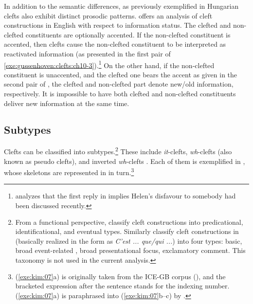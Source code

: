 In addition to the semantic differences, as previously exemplified in
Hungarian  clefts also exhibit distinct prosodic
patterns.  \citet{gussenhoven:07} offers an analysis of cleft
constructions in English with respect to information status.  The
clefted and non-clefted constituents are optionally accented.  If the
non-clefted constituent is accented, then clefts cause the non-clefted
constituent to be interpreted as reactivated information (as presented
in the first pair of
\ref{exe:gussenhoven:clefts:ch10-3}).\footnote{\citet{gussenhoven:07}
  analyzes that the first reply in
   implies Helen's disfavour
  to somebody had been discussed recently.}  On the other hand, if the
non-clefted constituent is unaccented, and the clefted one bears the
accent as given in the second pair of
, the clefted and
non-clefted part denote new/old information, respectively. It is
impossible to have both clefted and non-clefted constituents deliver
new information at the same time.



\subsection{Subtypes}
\label{10:sssec:clefts:subtypes}


Clefts can be classified into subtypes.\footnote{From a
  functional perspective, \citet{kim:yang:09} classify cleft
  constructions into predicational, identificational, and eventual
  types.  Similarly \citet{clech:99} classify cleft constructions in
   (basically realized in the form as \textit{C'est ... que/qui
    ...})  into four types: basic, broad event-related , broad
  presentational focus, exclamatory comment. This taxonomy is not used
  in the current analysis.}  These include \textit{it}-clefts,
\textit{wh}-clefts (also known as pseudo clefts), and inverted
\textit{wh}-clefts \citep{kim:07}.  Each of them is exemplified in
, whose skeletons are represented in
 in turn.\footnote{(\ref{exe:kim:07}a) is
  originally taken from the ICE-GB corpus (\citealt{nelson:etal:02}),
  and the bracketed expression after the sentence stands for the
  indexing number. (\ref{exe:kim:07}a) is paraphrased into
  (\ref{exe:kim:07}b--c) by \citet{kim:07}.}


